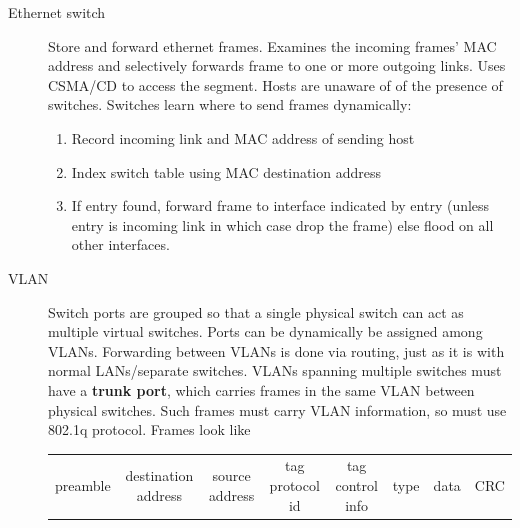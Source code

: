 \documentclass{article}
\begin{document}
\begin{description}
    \item[Ethernet switch] Store and forward ethernet frames. Examines the incoming frames' MAC address and
    selectively forwards frame to one or more outgoing links. Uses CSMA/CD to access the segment. Hosts 
    are unaware of of the presence of switches. Switches learn where to send frames dynamically:
    \begin{enumerate}
        \item Record incoming link and MAC address of sending host
        \item Index switch table using MAC destination address
        \item If entry found, forward frame to interface indicated by entry (unless entry is incoming link
        in which case drop the frame) else flood on all other interfaces.
    \end{enumerate}
    
    \item[VLAN] Switch ports are grouped so that a single physical switch can act as multiple virtual 
    switches. Ports can be dynamically be assigned among VLANs. Forwarding between VLANs is done via 
    routing, just as it is with normal LANs/separate switches. VLANs spanning multiple switches must have
    a \textbf{trunk port}, which carries frames in the same VLAN between physical switches. Such frames
    must carry VLAN information, so must use 802.1q protocol. Frames look like
    
    \begin{tabular}{c|c|c|c|c|c|c|c}
    preamble & destination address & source address & tag protocol id & tag control info & type & data & CRC
    \end{tabular}
    

\end{description}
\end{document}
